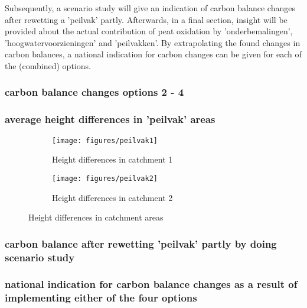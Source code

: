 \documentclass[12pt,a4paper,titlepage]{article}
\begin{document}
Subsequently, a scenario study will give an indication of carbon balance changes after rewetting a 'peilvak' partly. Afterwards, in a final section, insight will be provided about the actual contribution of peat oxidation by 'onderbemalingen', 'hoogwatervoorzieningen' and 'peilvakken'. By extrapolating the found changes in carbon balances, a national indication for carbon changes can be given for each of the (combined) options. 

\subsubsection{carbon balance changes options 2 - 4}

\subsubsection{average height differences in 'peilvak' areas}


\begin{figure}
    \centering
    \begin{subfigure}[a]{0.3\textwidth}
    	\texttt{[image: figures/peilvak1]} 
    	\caption{Height differences in catchment 1}
    	\label{fig:peilvak1}
    \end{subfigure}	
    \quad
    \begin{subfigure}[a]{0.3\textwidth}
    	\texttt{[image: figures/peilvak2]} 
    	\caption{Height differences in catchment 2}
    	\label{fig:peilvak2}
    \end{subfigure}	
    \caption{Height differences in catchment areas}
    \label{fig:azolla}
\end{figure}


\subsubsection{carbon balance after rewetting 'peilvak' partly by doing scenario study}

\subsubsection{national indication for carbon balance changes as a result of implementing either of the four options}


\end{document}
